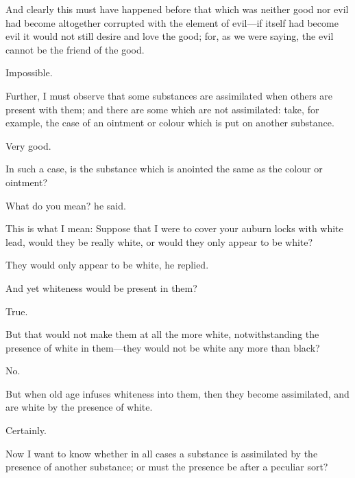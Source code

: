 \documentclass[11pt,letter]{article}
\begin{document}
\par  And clearly this must have happened before that which was neither good nor evil had become altogether corrupted with the element of evil—if itself had become evil it would not still desire and love the good; for, as we were saying, the evil cannot be the friend of the good.

\par  Impossible.

\par  Further, I must observe that some substances are assimilated when others are present with them; and there are some which are not assimilated: take, for example, the case of an ointment or colour which is put on another substance.

\par  Very good.

\par  In such a case, is the substance which is anointed the same as the colour or ointment?

\par  What do you mean? he said.

\par  This is what I mean: Suppose that I were to cover your auburn locks with white lead, would they be really white, or would they only appear to be white?

\par  They would only appear to be white, he replied.

\par  And yet whiteness would be present in them?

\par  True.

\par  But that would not make them at all the more white, notwithstanding the presence of white in them—they would not be white any more than black?

\par  No.

\par  But when old age infuses whiteness into them, then they become assimilated, and are white by the presence of white.

\par  Certainly.

\par  Now I want to know whether in all cases a substance is assimilated by the presence of another substance; or must the presence be after a peculiar sort?
\end{document}
